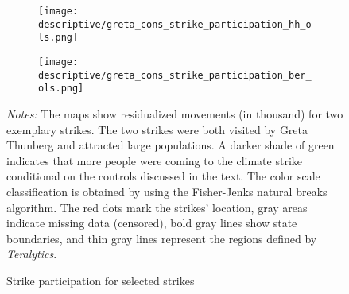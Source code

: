 \begin{figure}[t]\centering
	\begin{subfigure}[h]{0.45\linewidth}\centering
		\texttt{[image: descriptive/greta\_cons\_strike\_participation\_hh\_ols.png]}
	\end{subfigure}
	\begin{subfigure}[h]{0.45\linewidth}\centering
		\texttt{[image: descriptive/greta\_cons\_strike\_participation\_ber\_ols.png]}
	\end{subfigure}
	\begin{minipage}{0.9\linewidth}
		\caption{Strike participation for selected strikes}
		\label{fig_greta_cons:strike_participation_hh_ber}
		\scriptsize{\emph{Notes:} The maps show residualized movements (in thousand) for two exemplary strikes. The two strikes were both visited by Greta Thunberg and attracted large populations. A darker shade of green indicates that more people were coming to the climate strike conditional on the controls discussed in the text. The color scale classification is obtained by using the Fisher-Jenks natural breaks algorithm. The red dots mark the strikes' location, gray areas indicate missing data (censored), bold gray lines show state boundaries, and thin gray lines represent the regions defined by \textit{Teralytics}.}
	\end{minipage}
\end{figure}